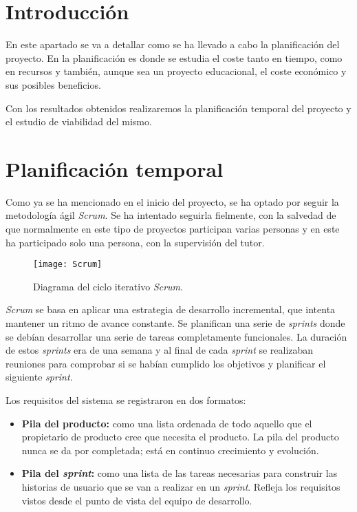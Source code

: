 
\section{Introducción}

En este apartado se va a detallar como se ha llevado a cabo la planificación del proyecto. En la planificación es donde se estudia el coste tanto en tiempo, como en recursos y también, aunque sea un proyecto educacional, el coste económico y sus posibles beneficios.

Con los resultados obtenidos realizaremos la planificación temporal del proyecto y el estudio de viabilidad del mismo. 

\section{Planificación temporal}

Como ya se ha mencionado en el inicio del proyecto, se ha optado por seguir la metodología ágil \emph{Scrum}. Se ha intentado seguirla fielmente, con la salvedad de que normalmente en este tipo de proyectos participan varias personas y en este ha participado solo una persona, con la supervisión del tutor.

\begin{figure}[H]
	\centering
	\texttt{[image: Scrum]}
	\caption{Diagrama del ciclo iterativo \emph{Scrum}.}
	\label{fig:Scrum}
\end{figure}

\emph{Scrum} se basa en aplicar una estrategia de desarrollo incremental, que intenta mantener un ritmo de avance constante. Se planifican una serie de \emph{sprints} donde se debían desarrollar una serie de tareas completamente funcionales. La duración de estos \emph{sprints} era de una semana y al final de cada \emph{sprint} se realizaban reuniones para comprobar si se habían cumplido los objetivos y planificar el siguiente \emph{sprint}.

Los requisitos del sistema se registraron en dos formatos:

\begin{itemize}
\item \textbf{Pila del producto:} como una  lista ordenada de todo aquello que el propietario de producto cree que necesita el producto. La pila del producto nunca se da por completada; está en continuo crecimiento y evolución.

\item \textbf{Pila del \emph{sprint}:} como una lista de las tareas necesarias para construir las historias de usuario que se van a realizar en un \emph{sprint}. Refleja los requisitos vistos desde el punto de vista del equipo de desarrollo.
 
\end{itemize}


